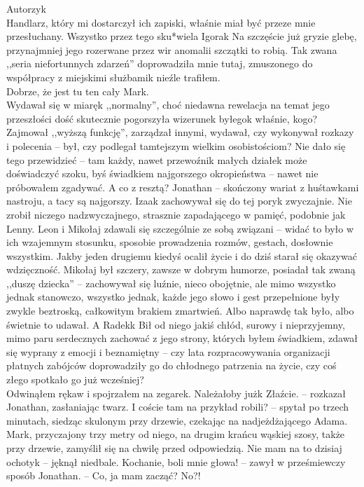 \documentclass[../MAIN.tex]{subfiles}
\begin{document}
Autorzy\3k\\
Handlarz, który mi dostarczył ich zapiski, właśnie miał być przeze mnie przesłuchany. Wszystko przez tego sku*wiela Igora\3k Na szczęście już gryzie glebę, przynajmniej jego rozerwane przez wir anomalii szczątki to robią. Tak zwana ,,seria niefortunnych zdarzeń'' doprowadziła mnie tutaj, zmuszonego do współpracy z miejskimi służbami\3k nieźle trafiłem.\\
Dobrze, że jest tu ten cały Mark.\\
Wydawał się w miarę\3k ,,normalny'', choć niedawna rewelacja na temat jego przeszłości dość skutecznie pogorszyła wizerunek byłego\3k właśnie, kogo? Zajmował ,,wyższą funkcję'', zarządzał innymi, wydawał, czy wykonywał rozkazy i polecenia -- był, czy podlegał tamtejszym wielkim osobistościom? Nie dało się tego przewidzieć -- tam każdy, nawet przewoźnik małych działek może doświadczyć szoku, byś świadkiem najgorszego okropieństwa -- nawet nie próbowałem zgadywać. A co z resztą? Jonathan -- skończony wariat z huśtawkami nastroju, a tacy są najgorszy. Izaak zachowywał się do tej pory\3k zwyczajnie. Nie zrobił niczego nadzwyczajnego, strasznie zapadającego w pamięć, podobnie jak Lenny. Leon i Mikołaj zdawali się szczególnie ze sobą związani -- widać to było w ich wzajemnym stosunku, sposobie prowadzenia rozmów, gestach, dosłownie wszystkim. Jakby jeden drugiemu kiedyś ocalił życie i do dziś starał się okazywać wdzięczność. Mikołaj był szczery, zawsze w dobrym humorze, posiadał tak zwaną ,,duszę dziecka'' -- 
zachowywał się
luźnie,
nieco obojętnie, ale mimo wszystko jednak stanowczo, wszystko jednak, każde jego słowo i gest przepełnione były zwykle beztroską, całkowitym brakiem zmartwień. Albo naprawdę tak było, albo świetnie to udawał. A Radek\3k Bił od niego jakiś chłód, surowy i nieprzyjemny, mimo paru serdecznych zachować z jego strony, których byłem świadkiem, zdawał się wyprany z emocji i beznamiętny -- czy lata rozpracowywania organizacji płatnych zabójców doprowadziły go do chłodnego patrzenia na życie, czy coś złego spotkało go już wcześniej?\\
Odwinąłem rękaw i spojrzałem na zegarek. Należałoby już\3k
\sx Złaźcie. -- rozkazał Jonathan, zasłaniając twarz.
\xx I coście tam na przykład robili? -- spytał po trzech minutach, siedząc skulonym przy drzewie, czekając na nadjeżdżającego Adama. Mark, przyczajony trzy metry od niego, na drugim krańcu wąskiej szosy, także przy drzewie, zamyślił się na chwilę przed odpowiedzią.
\xx Nie mam na to dzisiaj ochoty\3k -- jęknął niedbale.
\xx Kochanie, boli mnie głowa! -- zawył w prześmiewczy sposób Jonathan. -- Co, ja mam zacząć? No?!
\end{document}
